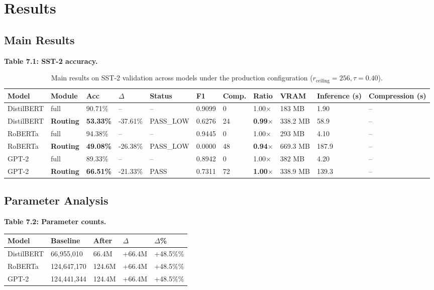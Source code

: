 
\section{Results}

\subsection{Main Results}

\textbf{Table 7.1: SST-2 accuracy.}

\begin{table}[t]
\centering
\small
\begin{tabular}{lllllllllll}
\toprule
\textbf{Model} & \textbf{Module} & \textbf{Acc} & \textbf{$\Delta$} & \textbf{Status} & \textbf{F1} & \textbf{Comp.} & \textbf{Ratio} & \textbf{VRAM} & \textbf{Inference (s)} & \textbf{Compression (s)} \\
\midrule
DistilBERT & full & 90.71\% & -- & -- & 0.9099 & 0 & 1.00$\times$ & 183 MB & 1.90 & -- \\
DistilBERT & \textbf{Routing} & \textbf{53.33\%} & -37.61\% & PASS_LOW & 0.6276 & 24 & \textbf{0.99$\times$} & 338.2 MB & 58.9 & -- \\
RoBERTa & full & 94.38\% & -- & -- & 0.9445 & 0 & 1.00$\times$ & 293 MB & 4.10 & -- \\
RoBERTa & \textbf{Routing} & \textbf{49.08\%} & -26.38\% & PASS_LOW & 0.0000 & 48 & \textbf{0.94$\times$} & 669.3 MB & 187.9 & -- \\
GPT-2 & full & 89.33\% & -- & -- & 0.8942 & 0 & 1.00$\times$ & 382 MB & 4.20 & -- \\
GPT-2 & \textbf{Routing} & \textbf{66.51\%} & -21.33\% & PASS & 0.7311 & 72 & \textbf{1.00$\times$} & 338.9 MB & 139.3 & -- \\
\bottomrule
\end{tabular}
\caption{Main results on SST-2 validation across models under the production configuration ($r_{\mathrm{ceiling}}=256, \tau=0.40$).}
\label{tab:main_sst2}
\end{table}

\subsection{Parameter Analysis}

\textbf{Table 7.2: Parameter counts.}

\begin{table}[H]
\centering
\small
\begin{tabular}{lllll}
\toprule
\textbf{Model} & \textbf{Baseline} & \textbf{After} & \textbf{$\Delta$} & \textbf{$\Delta$\%} \\
\midrule
DistilBERT & 66,955,010 & 66.4M & +66.4M & +48.5\%\% \\
RoBERTa & 124,647,170 & 124.6M & +66.4M & +48.5\%\% \\
GPT-2 & 124,441,344 & 124.4M & +66.4M & +48.5\%\% \\
\bottomrule
\end{tabular}
\end{table}

